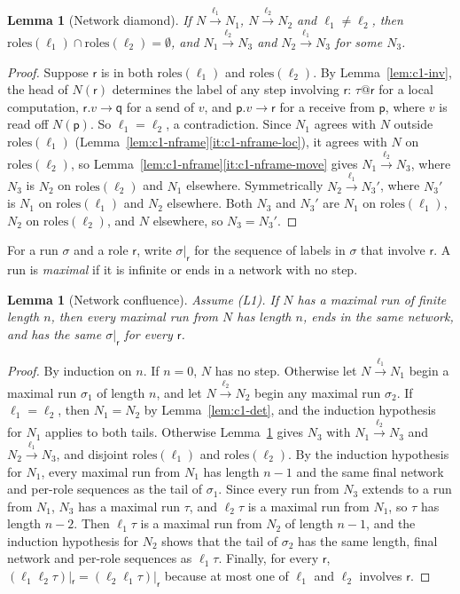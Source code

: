 \documentclass[11pt]{report}
\makeatletter
\theoremstyle{plain}
\newtheorem{lemma}[theorem]{Lemma}
\theoremstyle{definition}
\theoremstyle{remark}
\newcommand{\pp}{\mathsf{p}}
\newcommand{\qq}{\mathsf{q}}
\newcommand{\rr}{\mathsf{r}}
\newcommand{\com}[3]{#1.#2 \to #3}
\newcommand{\roles}[1]{\mathrm{roles}(#1)}
\newcommand{\tauat}[1]{\tau\mathord{@}#1}
\newcommand{\lto}[1]{\xrightarrow{\;#1\;}}
\makeatother
\begin{document}
\begin{lemma}[Network diamond]\label{lem:c1-diamond}
  If $N\lto{\ell_1}N_1$, $N\lto{\ell_2}N_2$ and $\ell_1\neq\ell_2$, then
  $\roles{\ell_1}\cap\roles{\ell_2}=\emptyset$, and $N_1\lto{\ell_2}N_3$ and
  $N_2\lto{\ell_1}N_3$ for some $N_3$.
\end{lemma}
\begin{proof}
  Suppose $\rr$ is in both $\roles{\ell_1}$ and $\roles{\ell_2}$.  By
  Lemma~\ref{lem:c1-inv}, the head of $N(\rr)$ determines the label of any
  step involving $\rr$: $\tauat{\rr}$ for a local computation,
  $\com{\rr}{v}{\qq}$ for a send of $v$, and $\com{\pp}{v}{\rr}$ for a receive
  from $\pp$, where $v$ is read off $N(\pp)$.  So $\ell_1=\ell_2$, a
  contradiction.  Since $N_1$ agrees with $N$ outside $\roles{\ell_1}$
  (Lemma~\ref{lem:c1-nframe}\ref{it:c1-nframe-loc}), it agrees with $N$ on
  $\roles{\ell_2}$, so Lemma~\ref{lem:c1-nframe}\ref{it:c1-nframe-move} gives
  $N_1\lto{\ell_2}N_3$, where $N_3$ is $N_2$ on $\roles{\ell_2}$ and $N_1$
  elsewhere.  Symmetrically $N_2\lto{\ell_1}N_3'$, where $N_3'$ is $N_1$ on
  $\roles{\ell_1}$ and $N_2$ elsewhere.  Both $N_3$ and $N_3'$ are $N_1$ on
  $\roles{\ell_1}$, $N_2$ on $\roles{\ell_2}$, and $N$ elsewhere, so
  $N_3=N_3'$.
\end{proof}

For a run $\sigma$ and a role $\rr$, write $\sigma|_\rr$ for the sequence of
labels in $\sigma$ that involve $\rr$.  A run is \emph{maximal} if it is
infinite or ends in a network with no step.

\begin{lemma}[Network confluence]\label{lem:c1-conf}
  Assume (L1).  If $N$ has a maximal run of finite length $n$, then every
  maximal run from $N$ has length $n$, ends in the same network, and has the
  same $\sigma|_\rr$ for every $\rr$.
\end{lemma}
\begin{proof}
  By induction on $n$.  If $n=0$, $N$ has no step.  Otherwise let
  $N\lto{\ell_1}N_1$ begin a maximal run $\sigma_1$ of length $n$, and let
  $N\lto{\ell_2}N_2$ begin any maximal run $\sigma_2$.  If $\ell_1=\ell_2$,
  then $N_1=N_2$ by Lemma~\ref{lem:c1-det}, and the induction hypothesis for
  $N_1$ applies to both tails.  Otherwise Lemma~\ref{lem:c1-diamond} gives
  $N_3$ with $N_1\lto{\ell_2}N_3$ and $N_2\lto{\ell_1}N_3$, and disjoint
  $\roles{\ell_1}$ and $\roles{\ell_2}$.  By the induction hypothesis for
  $N_1$, every maximal run from $N_1$ has length $n-1$ and the same final
  network and per-role sequences as the tail of $\sigma_1$.  Since every run
  from $N_3$ extends to a run from $N_1$, $N_3$ has a maximal run $\tau$, and
  $\ell_2\tau$ is a maximal run from $N_1$, so $\tau$ has length $n-2$.
  Then $\ell_1\tau$ is a maximal run from $N_2$ of length $n-1$, and the
  induction hypothesis for $N_2$ shows that the tail of $\sigma_2$ has the
  same length, final network and per-role sequences as $\ell_1\tau$.  Finally,
  for every $\rr$, $(\ell_1\ell_2\tau)|_\rr=(\ell_2\ell_1\tau)|_\rr$ because at
  most one of $\ell_1$ and $\ell_2$ involves $\rr$.
\end{proof}
\end{document}
